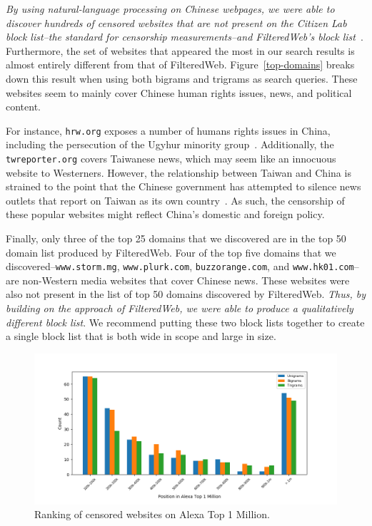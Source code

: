 \textit{By using natural-language processing on Chinese webpages, we
were able to discover hundreds of censored websites that are not
present on the Citizen Lab block list--the standard for censorship
measurements--and FilteredWeb's block list~\cite{darer2017filteredweb,
citizenlab:block}}. Furthermore, the set of websites that appeared the
most in our search results is almost entirely different from that of
FilteredWeb. Figure~\ref{top-domains} breaks down this result when
using both bigrams and trigrams as search queries. These websites seem
to mainly cover Chinese human rights issues, news, and political
content.

For instance, \texttt{hrw.org} exposes a number of humans rights
issues in China, including the persecution of the Ugyhur minority
group~\cite{hrw:uighur}. Additionally, the \texttt{twreporter.org}
covers Taiwanese news, which may seem like an innocuous website to
Westerners. However, the relationship between Taiwan and China is
strained to the point that the Chinese government has attempted to
silence news outlets that report on Taiwan as its own
country~\cite{wapo:taiwan}. As such, the censorship of these popular
websites might reflect China's domestic and foreign policy.

Finally, only three of the top 25 domains that we discovered are in
the top 50 domain list produced by FilteredWeb. Four of the top five
domains that we discovered--\texttt{www.storm.mg},
\texttt{www.plurk.com}, \texttt{buzzorange.com}, and
\texttt{www.hk01.com}--are non-Western media websites that cover
Chinese news. These websites were also not present in the list of top
50 domains discovered by FilteredWeb. \textit{Thus, by building on the
approach of FilteredWeb, we were able to produce a qualitatively
different block list}. We recommend putting these two block lists
together to create a single block list that is both wide in scope and
large in size.

\begin{figure}[t]
  \centering
  \includegraphics[scale=0.6]{figures/alexa}
  \caption{\label{alexa}Ranking of censored websites on Alexa Top 1 Million.}
\end{figure}

